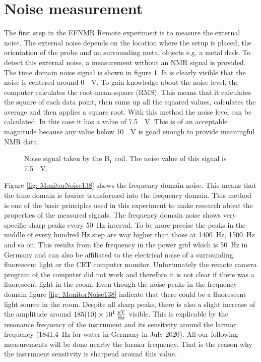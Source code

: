 \section{Noise measurement}
\label{sec:Noisemeasurement}
The first step in the EFNMR Remote experiment is to measure the external noise.
The external noise depends on the location where the setup is placed, the orientation of the probe and on surrounding metal objects e.g. a metal desk.
To detect this external noise, a measurement without an NMR signal is provided.
The time domain noise signal is shown in figure \ref{fig: noise}.
It is clearly visible that the noise is centered around \SI{0}{\mu \volt}.
To gain knowledge about the noise level, the computer calculates the root-mean-square (RMS).
This means that it calculates the square of each data point, then sums up all the squared values, calculates the average and then applies a square root.
With this method the noise level can be calculated.
In this case it has a value of \SI{7.5}{\mu \volt}.
This is of an acceptable magnitude because any value below \SI{10}{\mu \volt} is good enough to provide meaningful NMR data.

\begin{figure}[H]
    \centering
    
    \caption[Noise signal taken by the B$_1$ coil.]{Noise signal taken by the B$_1$ coil.
    The noise value of this signal is \SI{7.5}{\mu \volt}.}
    \label{fig: noise}
\end{figure}

Figure \ref{fig: MonitorNoise138} shows the frequency domain noise.
This means that the time domain is fourier transformed into the frequency domain.
This method is one of the basic principles used in this experiment to make research about the properties of the measured signals.
The frequency domain noise shows very specific sharp peaks every \SI{50}{\hertz} interval.
To be more precise the peaks in the middle of every hundred \si{\hertz} step are way higher than those at \SI{1400}{\hertz}, \SI{1500}{\hertz} and so on.
This results from the frequency in the power grid which is \SI{50}{\hertz} in Germany and can also be affiliated to the electrical noise of a surrounding fluorescent light or the CRT computer monitor.
Unfortunately the remote camera program of the computer did not work and therefore it is not clear if there was a fluorescent light in the room.
Even though the noise peaks in the frequency domain figure \ref{fig: MonitorNoise138} indicate that there could be a fluorescent light source in the room.
Despite all sharp peaks, there is also a slight increase of the amplitude around $\SI{185 \pm 10 e1}{\frac{\mu \volt}{\hertz}}$ visible.
This is explicable by the resonance frequency of the instrument and its sensitvity around the larmor frequency (\SI{1841.4}{\hertz} for water in Germany in July 2020).
All our following measurements will be done nearby the larmor frequency.
That is the reason why the instrument sensitvity is sharpend around this value.

